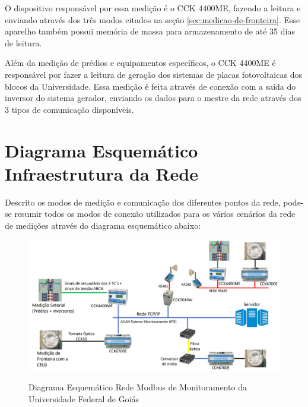 O dispositivo responsável por essa medição é o CCK 4400ME, fazendo a leitura e enviando através dos três modos citados na seção \ref{sec:medicao-de-fronteira}. Esse aparelho também possui memória de massa para armazenamento de até 35 dias de leitura.

Além da medição de prédios e equipamentos específicos, o CCK 4400ME é responsável por fazer a leitura de geração dos sistemas de placas fotovoltaicas dos blocos da Universidade. Essa medição é feita através de conexão com a saída do inversor do sistema gerador, enviando os dados para o mestre da rede através dos 3 tipos de comunicação disponíveis.

\section{Diagrama Esquemático Infraestrutura da Rede}

Descrito os modos de medição e comunicação dos diferentes pontos da rede, pode-se resumir todos os modos de conexão utilizados para os vários cenários da rede de medições através do diagrama esquemático abaixo:
\newline

\begin{figure}[H]
    \centering
    \caption{Diagrama Esquemático Rede Modbus de Monitoramento da Universidade Federal de Goiás}
    \includegraphics[width=\linewidth]{imagens/esquema-rede-modbus.png}
    \label{fig:diagrama-rede-ufg}
\end{figure}
